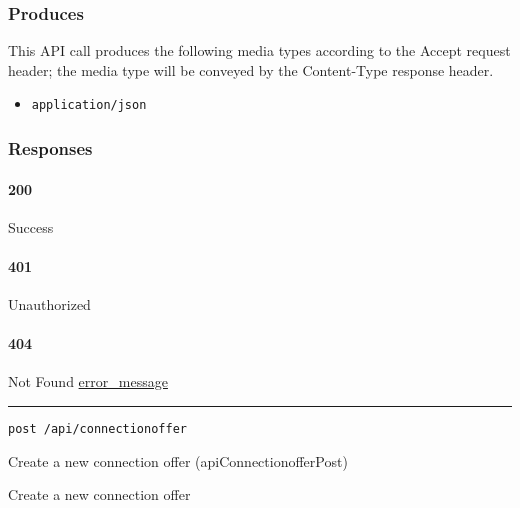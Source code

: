 \hypertarget{produces-21}{%
\subsubsection{Produces}\label{produces-21}}

This API call produces the following media types according to the
{Accept} request header; the media type will be conveyed by the
{Content-Type} response header.

\begin{itemize}
\tightlist
\item
  \texttt{application/json}
\end{itemize}

\hypertarget{responses-21}{%
\subsubsection{Responses}\label{responses-21}}

\hypertarget{section-69}{%
\paragraph{200}\label{section-69}}

Success

\hypertarget{section-70}{%
\paragraph{401}\label{section-70}}

Unauthorized \protect\hyperlink{}{}

\hypertarget{section-71}{%
\paragraph{404}\label{section-71}}

Not Found \protect\hyperlink{error_message}{error\_message}

\begin{center}\rule{0.5\linewidth}{\linethickness}\end{center}

\protect\hypertarget{apiConnectionofferPost}{}{}

\begin{verbatim}
post /api/connectionoffer
\end{verbatim}

Create a new connection offer ({apiConnectionofferPost})

Create a new connection offer


